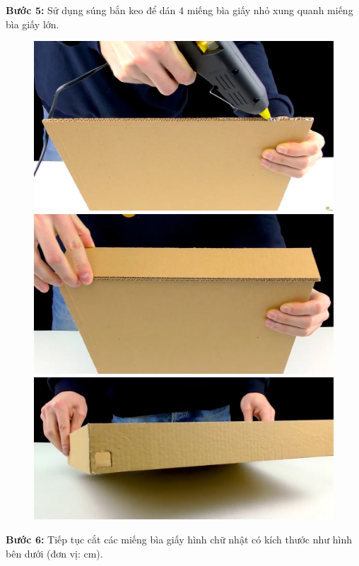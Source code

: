 \begin{multicols}{2}
\begin{figure}[H]
		\vspace*{-10pt}
	\end{figure}
	\textbf{\color{toancuabi}Bước $\pmb{5}$:} Sử dụng súng bắn keo để dán $4$ miếng bìa giấy nhỏ xung quanh miếng bìa giấy lớn.
	\begin{figure}[H]
		\vspace*{-5pt}
		\centering
		\captionsetup{labelformat= empty, justification=centering}
		\includegraphics[width= 0.9\linewidth]{7}
		\includegraphics[width= 0.9\linewidth]{8}
		\includegraphics[width= 0.9\linewidth]{9}
		\vspace*{-10pt}
	\end{figure}
	\textbf{\color{toancuabi}Bước $\pmb{6}$:} Tiếp tục cắt các miếng bìa giấy hình chữ nhật có kích thước như hình bên dưới (đơn vị: cm).

\end{multicols}
